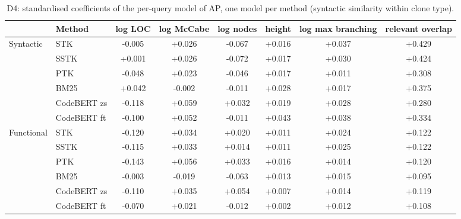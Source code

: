 \begin{table}[!htbp]
\centering
\caption{D4: standardised coefficients of the per-query model of AP, one model per method (syntactic similarity within clone type).}
\label{tab:d4}
\footnotesize
\setlength{\tabcolsep}{4pt}
\begin{tabular}{llcccccc}
\toprule
 & Method & log LOC & log McCabe & log nodes & height & log max branching & relevant overlap \\
\midrule
Syntactic & STK & -0.005 & +0.026 & -0.067 & +0.016 & +0.037 & +0.429 \\
 & SSTK & +0.001 & +0.026 & -0.072 & +0.017 & +0.030 & +0.424 \\
 & PTK & -0.048 & +0.023 & -0.046 & +0.017 & +0.011 & +0.308 \\
 & BM25 & +0.042 & -0.002 & -0.011 & +0.028 & +0.017 & +0.375 \\
 & CodeBERT zs & -0.118 & +0.059 & +0.032 & +0.019 & +0.028 & +0.280 \\
 & CodeBERT ft & -0.100 & +0.052 & -0.011 & +0.043 & +0.038 & +0.334 \\
\midrule
Functional & STK & -0.120 & +0.034 & +0.020 & +0.011 & +0.024 & +0.122 \\
 & SSTK & -0.115 & +0.033 & +0.014 & +0.011 & +0.025 & +0.122 \\
 & PTK & -0.143 & +0.056 & +0.033 & +0.016 & +0.014 & +0.120 \\
 & BM25 & -0.003 & -0.019 & -0.063 & +0.013 & +0.015 & +0.095 \\
 & CodeBERT zs & -0.110 & +0.035 & +0.054 & +0.007 & +0.014 & +0.119 \\
 & CodeBERT ft & -0.070 & +0.021 & -0.012 & +0.002 & +0.012 & +0.108 \\
\bottomrule
\end{tabular}
\end{table}
